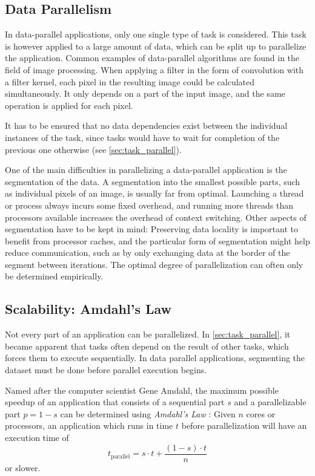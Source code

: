\documentclass[BCOR20mm,DIV14,10pt,headinclude,footexclude,bibtotoc,liststotoc]{article}
\begin{document}
\subsection{Data Parallelism}
In data-parallel applications, only one single type of task is considered. This
task is however applied to a large amount of data, which can be split up to
parallelize the application. Common examples of data-parallel algorithms are
found in the field of image processing. When applying a filter in the form of
convolution with a filter kernel, each pixel in the resulting image could be
calculated simultaneously. It only depends on a part of the input image, and the
same operation is applied for each pixel.

It has to be ensured that no data dependencies exist between the individual
instances of the task, since tasks would have to wait for completion of the
previous one otherwise (see \cref{sec:task_parallel}).

One of the main difficulties in parallelizing a data-parallel application is the
segmentation of the data. A segmentation into the smallest possible parts, such
as individual pixels of an image, is usually far from optimal. Launching a
thread or process always incurs some fixed overhead, and running more threads
than processors available increases the overhead of context switching. Other
aspects of segmentation have to be kept in mind: Preserving data locality is
important to benefit from processor caches, and the particular form of
segmentation might help reduce communication, such as by only exchanging data at
the border of the segment between iterations. The optimal degree of
parallelization can often only be determined empirically.

\subsection{Scalability: Amdahl's Law}
\label{sec:amdahl}
Not every part of an application can be parallelized. In
\cref{sec:task_parallel}, it became apparent that tasks often depend on the
result of other tasks, which forces them to execute sequentially. In data
parallel applications, segmenting the dataset must be done before parallel
execution begins.

Named after the computer scientist Gene Amdahl, the maximum possible speedup of
an application that consists of a sequential part $s$ and a parallelizable part
$p=1-s$ can be determined using \emph{Amdahl's Law} \cite{amdahl1967}: Given $n$
cores or processors, an application which runs in time $t$ before
parallelization will have an execution time of
\begin{equation}
	t_\text{parallel} = s \cdot t + \frac{(1-s)\cdot t}{n}
\end{equation}
or slower.
\end{document}
